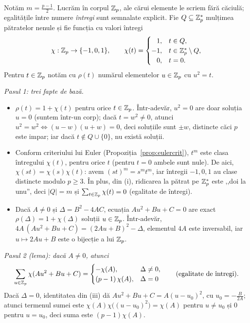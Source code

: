 \begin{solutie}
Notăm $m = \frac{p-1}{2}$. Lucrăm în corpul $\mathbb{Z}_p$, ale cărui elemente le scriem fără căciulă; egalitățile între numere \emph{întregi} sunt semnalate explicit. Fie $Q \subseteq \mathbb{Z}_p^*$ mulțimea pătratelor nenule și fie funcția cu valori întregi
\[
  \chi : \mathbb{Z}_p \to \{-1, 0, 1\}, \qquad
  \chi(t) =
  \begin{cases}
    \phantom{-}1, & t \in Q,\\
    -1, & t \in \mathbb{Z}_p^* \setminus Q,\\
    \phantom{-}0, & t = 0.
  \end{cases}
\]
Pentru $t \in \mathbb{Z}_p$ notăm cu $\rho(t)$ numărul elementelor $u \in \mathbb{Z}_p$ cu $u^2 = t$.

\emph{Pasul 1: trei fapte de bază.}
\begin{itemize}
\item[(i)] $\rho(t) = 1 + \chi(t)$ pentru orice $t \in \mathbb{Z}_p$. Într-adevăr, $u^2 = 0$ are doar soluția $u = 0$ (suntem într-un corp); dacă $t = w^2 \neq 0$, atunci $u^2 = w^2 \iff (u-w)(u+w) = 0$, deci soluțiile sunt $\pm w$, distincte căci $p$ este impar; iar dacă $t \notin Q \cup \{0\}$, nu există soluții.
\item[(ii)] Conform criteriului lui Euler (Propoziția~\ref{prop:eulercrit}), $t^{m}$ este clasa întregului $\chi(t)$, pentru orice $t$ (pentru $t = 0$ ambele sunt nule). De aici, $\chi(st) = \chi(s)\chi(t)$: avem $(st)^m = s^m t^m$, iar întregii $-1, 0, 1$ au clase distincte modulo $p \ge 3$. În plus, din (i), ridicarea la pătrat pe $\mathbb{Z}_p^*$ este ,,doi la unu'', deci $|Q| = m$ și $\sum_{t \in \mathbb{Z}_p} \chi(t) = 0$ (egalitate de întregi).
\item[(iii)] Dacă $A \neq 0$ și $\Delta = B^2 - 4AC$, ecuația $Au^2 + Bu + C = 0$ are exact $\rho(\Delta) = 1 + \chi(\Delta)$ soluții $u \in \mathbb{Z}_p$. Într-adevăr, $4A\,(Au^2 + Bu + C) = (2Au + B)^2 - \Delta$, elementul $4A$ este inversabil, iar $u \mapsto 2Au + B$ este o bijecție a lui $\mathbb{Z}_p$.
\end{itemize}

\emph{Pasul 2 (lema): dacă $A \neq 0$, atunci}
\[
  \sum_{u \in \mathbb{Z}_p} \chi(Au^2 + Bu + C) =
  \begin{cases}
    -\chi(A), & \Delta \neq 0,\\
    (p-1)\,\chi(A), & \Delta = 0
  \end{cases}
  \qquad \text{(egalitate de întregi)}.
\]
Dacă $\Delta = 0$, identitatea din (iii) dă $Au^2 + Bu + C = A(u - u_0)^2$, cu $u_0 = -\frac{B}{2A}$; atunci termenul sumei este $\chi(A)\chi\bigl((u-u_0)^2\bigr) = \chi(A)$ pentru $u \neq u_0$ și $0$ pentru $u = u_0$, deci suma este $(p-1)\chi(A)$.


\end{solutie}
